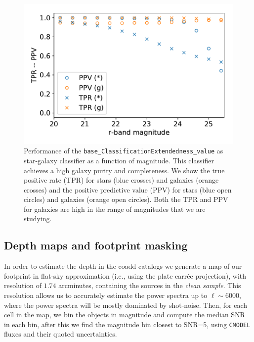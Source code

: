 \documentclass[\docopts]{\docclass}
\begin{document}
\begin{figure}
\centering
\includegraphics[width=0.9\columnwidth]{stellar_contamination_v2}
\caption{Performance of the \texttt{base\_ClassificationExtendedness\_value} as star-galaxy classifier as a function of magnitude. This classifier achieves a high galaxy purity and completeness. We show the true positive rate (TPR) for stars (blue crosses) and galaxies (orange crosses) and the positive predictive value (PPV) for stars (blue open circles) and galaxies (orange open circles). Both the TPR and PPV for galaxies are high in the range of magnitudes that we are studying.}
\label{fig:star_galaxy_separation}
\end{figure}
\subsection{Depth maps and footprint masking}
\label{sec:masking}

In order to estimate the depth in the coadd catalogs we generate a map of our footprint in flat-sky approximation (i.e., using the plate carr\'{e}e projection), with resolution of $1.74$ arcminutes, containing the sources in the \textit{clean sample}. This resolution allows us to accurately estimate the power spectra up to $\ell \sim 6000$, where the power spectra will be mostly dominated by shot-noise. Then, for each cell in the map, we bin the objects in magnitude and compute  the median SNR in each bin, after this we find the magnitude bin closest to SNR=5, using \texttt{CMODEL} fluxes and their quoted uncertainties.
\end{document}
